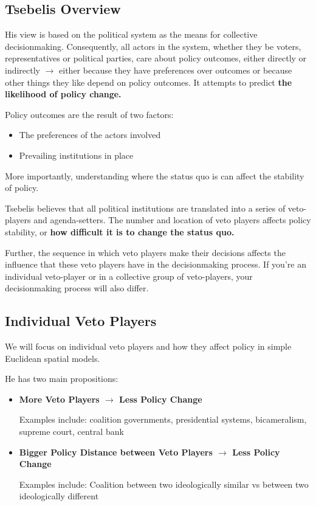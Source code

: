 \documentclass[12pt, letterpaper]{article}
\begin{document}
\subsection{Tsebelis Overview}
His view is based on the political system as the means for collective decisionmaking. Consequently, all actors in the system, whether they be voters, representatives or political parties, care about policy outcomes, either directly or indirectly $\rightarrow$ either because they have preferences over outcomes or because other things they like depend on policy outcomes. It attempts to predict \textbf{the likelihood of policy change.}

Policy outcomes are the result of two factors:
\begin{itemize}
	\item The preferences of the actors involved
	\item Prevailing institutions in place
\end{itemize}
More importantly, understanding where the status quo is can affect the stability of policy.

Tsebelis believes that all political institutions are translated into a series of veto-players and agenda-setters. The number and location of veto players affects policy stability, or \textbf{how difficult it is to change the status quo.}

Further, the sequence in which veto players make their decisions affects the influence that these veto players have in the decisionmaking process. If you're an individual veto-player or in a collective group of veto-players, your decisionmaking process will also differ.

\subsection{Individual Veto Players}
We will focus on individual veto players and how they affect policy in simple Euclidean spatial models.

He has two main propositions:
\begin{itemize}
	\item \textbf{More Veto Players $\rightarrow$ Less Policy Change}
	
	Examples include: coalition governments, presidential systems, bicameralism, supreme court, central bank
	\item \textbf{Bigger Policy Distance between Veto Players $\rightarrow$ Less Policy Change}
	
	Examples include: Coalition between two ideologically similar vs between two ideologically different
\end{itemize}
\end{document}
